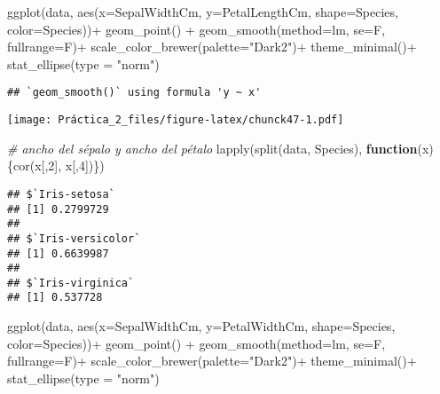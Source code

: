 \documentclass[
]{article}
\newenvironment{Shaded}{\begin{snugshade}}{\end{snugshade}}
\newcommand{\AttributeTok}[1]{\textcolor[rgb]{0.77,0.63,0.00}{#1}}
\newcommand{\CommentTok}[1]{\textcolor[rgb]{0.56,0.35,0.01}{\textit{#1}}}
\newcommand{\ControlFlowTok}[1]{\textcolor[rgb]{0.13,0.29,0.53}{\textbf{#1}}}
\newcommand{\DecValTok}[1]{\textcolor[rgb]{0.00,0.00,0.81}{#1}}
\newcommand{\FunctionTok}[1]{\textcolor[rgb]{0.00,0.00,0.00}{#1}}
\newcommand{\NormalTok}[1]{#1}
\newcommand{\SpecialCharTok}[1]{\textcolor[rgb]{0.00,0.00,0.00}{#1}}
\newcommand{\StringTok}[1]{\textcolor[rgb]{0.31,0.60,0.02}{#1}}
\begin{document}
\begin{Shaded}
\begin{Highlighting}[]
\FunctionTok{ggplot}\NormalTok{(data, }\FunctionTok{aes}\NormalTok{(}\AttributeTok{x=}\NormalTok{SepalWidthCm, }\AttributeTok{y=}\NormalTok{PetalLengthCm, }\AttributeTok{shape=}\NormalTok{Species, }\AttributeTok{color=}\NormalTok{Species))}\SpecialCharTok{+}
  \FunctionTok{geom\_point}\NormalTok{() }\SpecialCharTok{+}
  \FunctionTok{geom\_smooth}\NormalTok{(}\AttributeTok{method=}\NormalTok{lm, }\AttributeTok{se=}\NormalTok{F, }\AttributeTok{fullrange=}\NormalTok{F)}\SpecialCharTok{+}
  \FunctionTok{scale\_color\_brewer}\NormalTok{(}\AttributeTok{palette=}\StringTok{"Dark2"}\NormalTok{)}\SpecialCharTok{+}
  \FunctionTok{theme\_minimal}\NormalTok{()}\SpecialCharTok{+}
  \FunctionTok{stat\_ellipse}\NormalTok{(}\AttributeTok{type =} \StringTok{"norm"}\NormalTok{)}
\end{Highlighting}
\end{Shaded}

\begin{verbatim}
## `geom_smooth()` using formula 'y ~ x'
\end{verbatim}

\texttt{[image: Práctica\_2\_files/figure-latex/chunck47-1.pdf]}

\begin{Shaded}
\begin{Highlighting}[]
\CommentTok{\# ancho del sépalo y ancho del pétalo}
\FunctionTok{lapply}\NormalTok{(}\FunctionTok{split}\NormalTok{(data, Species), }\ControlFlowTok{function}\NormalTok{(x)\{}\FunctionTok{cor}\NormalTok{(x[,}\DecValTok{2}\NormalTok{], x[,}\DecValTok{4}\NormalTok{])\})}
\end{Highlighting}
\end{Shaded}

\begin{verbatim}
## $`Iris-setosa`
## [1] 0.2799729
## 
## $`Iris-versicolor`
## [1] 0.6639987
## 
## $`Iris-virginica`
## [1] 0.537728
\end{verbatim}

\begin{Shaded}
\begin{Highlighting}[]
\FunctionTok{ggplot}\NormalTok{(data, }\FunctionTok{aes}\NormalTok{(}\AttributeTok{x=}\NormalTok{SepalWidthCm, }\AttributeTok{y=}\NormalTok{PetalWidthCm, }\AttributeTok{shape=}\NormalTok{Species, }\AttributeTok{color=}\NormalTok{Species))}\SpecialCharTok{+}
  \FunctionTok{geom\_point}\NormalTok{() }\SpecialCharTok{+}
  \FunctionTok{geom\_smooth}\NormalTok{(}\AttributeTok{method=}\NormalTok{lm, }\AttributeTok{se=}\NormalTok{F, }\AttributeTok{fullrange=}\NormalTok{F)}\SpecialCharTok{+}
  \FunctionTok{scale\_color\_brewer}\NormalTok{(}\AttributeTok{palette=}\StringTok{"Dark2"}\NormalTok{)}\SpecialCharTok{+}
  \FunctionTok{theme\_minimal}\NormalTok{()}\SpecialCharTok{+}
  \FunctionTok{stat\_ellipse}\NormalTok{(}\AttributeTok{type =} \StringTok{"norm"}\NormalTok{)}
\end{Highlighting}
\end{Shaded}
\end{document}
